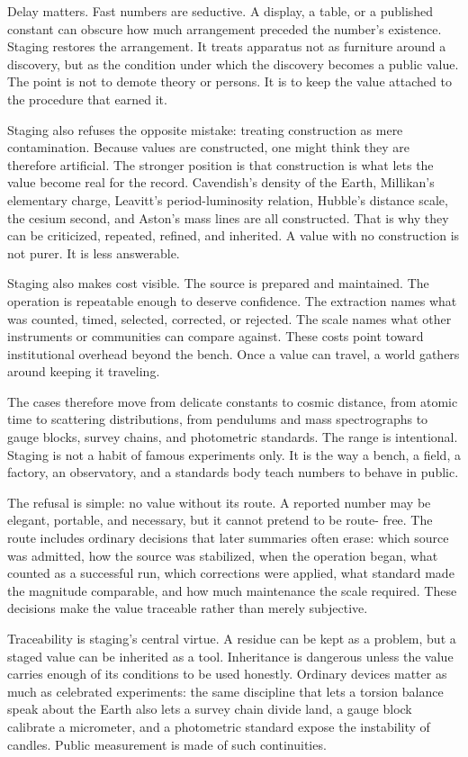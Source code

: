 \begin{chapteressay}
Delay matters. Fast numbers are seductive. A display, a table, or a
published constant can obscure how much arrangement preceded the number's
existence. Staging restores the arrangement. It treats apparatus not as
furniture around a discovery, but as the condition under which the
discovery becomes a public value. The point is not to demote theory or
persons. It is to keep the value attached to the procedure that earned it.

Staging also refuses the opposite mistake: treating construction as mere
contamination. Because values are constructed, one might think they are
therefore artificial. The stronger position is that construction is what
lets the value become real for the record. Cavendish's density of the
Earth, Millikan's elementary charge, Leavitt's period-luminosity relation,
Hubble's distance scale, the cesium second, and Aston's mass lines are all
constructed. That is why they can be criticized, repeated, refined, and
inherited. A value with no construction is not purer. It is less
answerable.

Staging also makes cost visible. The source is prepared and maintained.
The operation is repeatable enough to deserve confidence. The extraction
names what was counted, timed, selected, corrected, or rejected. The scale
names what other instruments or communities can compare against. These
costs point toward institutional overhead beyond the bench. Once a value
can travel, a world gathers around keeping it traveling.

The cases therefore move from delicate constants to cosmic distance, from
atomic time to scattering distributions, from pendulums and mass
spectrographs to gauge blocks, survey chains, and photometric standards.
The range is intentional. Staging is not a habit of famous experiments
only. It is the way a bench, a field, a factory, an observatory, and a
standards body teach numbers to behave in public.

The refusal is simple: no value without its route. A reported number may
be elegant, portable, and necessary, but it cannot pretend to be route-
free. The route includes ordinary decisions that later summaries often
erase: which source was admitted, how the source was stabilized, when the
operation began, what counted as a successful run, which corrections were
applied, what standard made the magnitude comparable, and how much
maintenance the scale required. These decisions make the value
traceable rather than merely subjective.

Traceability is staging's central virtue. A residue can be kept as a
problem, but a staged value can be inherited as a tool. Inheritance is
dangerous unless the value carries enough of its conditions to be used
honestly. Ordinary devices matter as much as celebrated experiments: the
same discipline that lets a torsion balance speak about the Earth also
lets a survey chain divide land, a gauge block calibrate a micrometer, and
a photometric standard expose the instability of candles. Public
measurement is made of such continuities.


\end{chapteressay}
